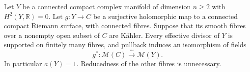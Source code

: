
\begin{proposition}\hypertarget{tag-01GG}{}\label{cdp:st:E1}


Let $Y$ be a connected compact complex manifold of dimension $n\geq2$
with $H^2(Y,\mathbb R)=0$. Let $g:Y\to C$ be a surjective holomorphic
map to a connected compact Riemann surface, with connected fibres.
Suppose that its smooth fibres over a nonempty open subset of $C$ are
K\"ahler. Every effective divisor of $Y$ is supported on finitely many
fibres, and pullback induces an isomorphism of fields
\[
 g^*: \mathcal M(C)\xrightarrow{\ \sim\ }\mathcal M(Y).
\]
In particular $a(Y)=1$. Reducedness of the other fibres is unnecessary.
\end{proposition}

